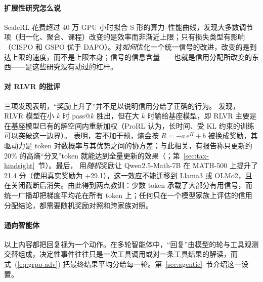 \paragraph{扩展性研究怎么说}
ScaleRL \citep{khatri2025art} 花费超过 40 万 GPU 小时拟合 S 形的算力--性能曲线，发现大多数调节项（归一化、聚合、课程）改变的是效率而非渐近上限；只有损失类型有影响（CISPO 和 GSPO 优于 DAPO）。对\emph{如何}优化一个统一信号的改进，改变的是到达上限的速度，而不是上限本身；信号的信息含量——也就是信用分配所改变的东西——是这些研究没有动过的杠杆。

\paragraph{对 RLVR 的批评}
三项发现表明，“奖励上升了”并不足以说明信用分给了正确的行为。\citet{yue2025does} 发现，RLVR 模型在小 $k$ 时 pass@$k$ 胜出，但在大 $k$ 时输给基座模型，即 RLVR 主要是在基座模型已有的解空间内重新加权（ProRL \citep{liu2025prorl}\unverified{} 认为，长时间、受 KL 约束的训练可以突破这一边界）。\citet{cui2025entropy} 表明，若不加干预，熵会按 $R=-a\,e^{H}+b$ 被换成奖励，其驱动力是 token 对数概率与其优势之间的协方差；与此相关，有报告称只更新约 20\% 的高熵“分叉”token 就能达到全量更新的效果（\citealp{wang2025beyond}\unverified；第~\ref{sec:tax-hindsight}~节）。最后，\citet{shao2025spurious} 用\emph{随机}奖励让 Qwen2.5-Math-7B 在 MATH-500 上提升了 21.4 分（使用真实奖励为 +29.1），这一效应不能迁移到 Llama3 或 OLMo2，且在关闭截断后消失。由此得到两点教训：少数 token 承载了大部分有用信号，而统一广播却把梯度平均花在所有 token 上；任何只在一个模型家族上评估的信用分配结论，都需要随机奖励对照和跨家族对照。

\paragraph{通向智能体}
以上内容都把回复视为一个动作。在多轮智能体中，“回复”由模型的轮与工具观测交替组成，决定性事件往往只是一次工具调用或对一条工具结果的解读，而式~(\ref{eq:grpo-adv}) 把最终结果平均分给每一轮。第~\ref{sec:agentic}~节介绍这一设置。

